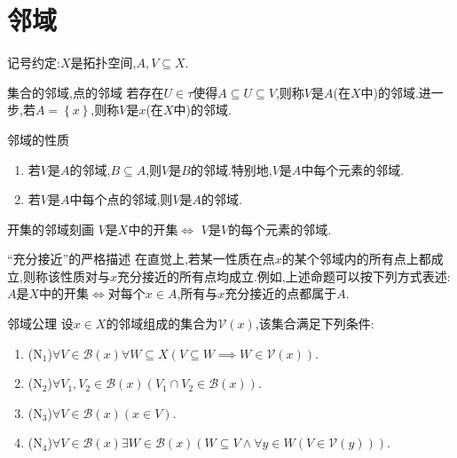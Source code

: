 \section{邻域}

记号约定:$X$是拓扑空间,$A,V\subseteq X$.

\begin{definition}{集合的邻域,点的邻域}{}
	若存在$U\in\tau$使得$A\subseteq U\subseteq V$,则称$V$是$A$(在$X$中)的邻域.进一步,若$A=\left\{x\right\}$,则称$V$是$x$(在$X$中)的邻域.
\end{definition}

\begin{proposition}{邻域的性质}{}
	\begin{enumerate}
		\item 若$V$是$A$的邻域,$B\subseteq A$,则$V$是$B$的邻域.特别地,$V$是$A$中每个元素的邻域.
		\item 若$V$是$A$中每个点的邻域,则$V$是$A$的邻域.
	\end{enumerate}
\end{proposition}

\begin{proposition}{开集的邻域刻画}{}
	$V$是$X$中的开集$\iff$ $V$是$V$的每个元素的邻域.
\end{proposition}

\begin{remark}{``充分接近''的严格描述}{}
	在直觉上,若某一性质在点$x$的某个邻域内的所有点上都成立,则称该性质对与$x$充分接近的所有点均成立.例如,上述命题可以按下列方式表述:$A$是$X$中的开集$\iff$对每个$x\in A$,所有与$x$充分接近的点都属于$A$.
\end{remark}

\begin{proposition}{邻域公理}{}
	设$x\in X$的邻域组成的集合为$\mathcal{V}\left(x\right)$,该集合满足下列条件:
	\begin{enumerate}
		\item ($\mathrm{N}_{1}$)$\forall V\in\mathcal{B}\left(x\right)\forall W\subseteq X\left(V\subseteq W\implies W\in\mathcal{V}\left(x\right)\right)$.
		\item ($\mathrm{N}_{2}$)$\forall V_{1},V_{2}\in\mathcal{B}\left(x\right)\left(V_{1}\cap V_{2}\in\mathcal{B}\left(x\right)\right)$.
		\item ($\mathrm{N}_{3}$)$\forall V\in\mathcal{B}\left(x\right)\left(x\in V\right)$.
		\item ($\mathrm{N}_{4}$)$\forall V\in\mathcal{B}\left(x\right)\exists W\in\mathcal{B}\left(x\right)\left(W\subseteq V\wedge\forall y\in W\left(V\in\mathcal{V}\left(y\right)\right)\right)$.
	\end{enumerate}
\end{proposition}

